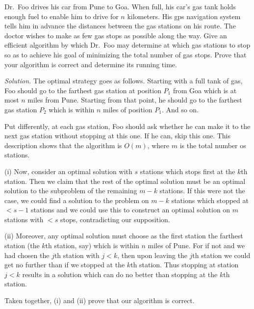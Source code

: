 \documentclass[10pt,reqno]{amsart}
\begin{document}
\begin{outline}[enumerate]
\medskip

\1 Dr.~Foo drives his car from Pune to Goa. When full, his car's gas tank holds
enough fuel to enable him to drive for $n$ kilometers. His gps navigation
system tells him in advance the distances between the gas stations on his
route. The doctor wishes to make as few gas stops as possible along the way.
Give an efficient algorithm by which Dr.~Foo may determine at which gas
stations to stop so as to achieve his goal of minimizing the total number of
gas stops. Prove that your algorithm is correct and determine its running time.

\medskip
\noindent \emph{Solution.} The optimal strategy goes as follows. Starting with
a full tank of gas, Foo should go to the farthest gas station at position $P_1$
from Goa which is at most $n$ miles from Pune. Starting from that point, he
should go to the farthest gas station $P_2$ which is within $n$ miles of
position $P_1$. And so on.

Put differently, at each gas station, Foo should ask whether he can make it to
the next gas station without stopping at this one. If he can, skip this one.
This description shows that the algorithm is $O(m)$, where $m$ is the total
number os stations.

(i) Now, consider an optimal solution with $s$ stations which stops first at
the $k$th station. Then we claim that the rest of the optimal solution must be
an optimal solution to the subproblem of the remaining $m-k$ stations. If this
were not the case, we could find a solution to the problem on $m-k$ stations
which stopped at $< s-1$ stations and we could use this to construct an optimal
solution on $m$ stations with $< s$ stops, contradicting our supposition.

(ii) Moreover, any optimal solution must choose as the first station the
farthest station (the $k$th station, say) which is within $n$ miles of Pune.
For if not and we had chosen the $j$th station with $j<k$, then upon leaving
the $j$th station we could get no further than if we stopped at the $k$th
station. Thus stopping at station $j < k$ results in a solution which can do no
better than stopping at the $k$th station.

Taken together, (i) and (ii) prove that our algorithm is correct.


\end{outline}
\end{document}
